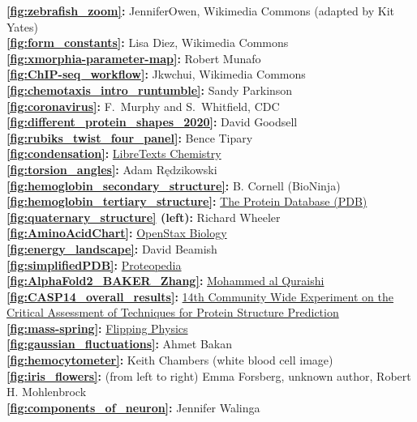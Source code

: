 \textbf{\autoref{fig:zebrafish_zoom}:} JenniferOwen, Wikimedia Commons (adapted by Kit Yates)\\
\textbf{\autoref{fig:form_constants}:} Lisa Diez, Wikimedia Commons\\
\textbf{\autoref{fig:xmorphia-parameter-map}:} Robert Munafo\\
\textbf{\autoref{fig:ChIP-seq_workflow}:} Jkwchui, Wikimedia Commons\\
\textbf{\autoref{fig:chemotaxis_intro_runtumble}:} Sandy Parkinson\\
\textbf{\autoref{fig:coronavirus}:} F.~Murphy and S.~Whitfield, CDC\\
\textbf{\autoref{fig:different_protein_shapes_2020}:} David Goodsell\\
\textbf{\autoref{fig:rubiks_twist_four_panel}:} Bence Tipary\\
\textbf{\autoref{fig:condensation}:} \href{https://bit.ly/3q0Ph8V}{LibreTexts Chemistry}\\
\textbf{\autoref{fig:torsion_angles}:} Adam Rędzikowski\\
\textbf{\autoref{fig:hemoglobin_secondary_structure}:} B. Cornell (BioNinja)\\
\textbf{\autoref{fig:hemoglobin_tertiary_structure}:} \href{https://www.rcsb.org/structure/1SI4}{The Protein Database (PDB)}\\
\textbf{\autoref{fig:quaternary_structure} (left):} Richard Wheeler\\
\textbf{\autoref{fig:AminoAcidChart}:} \href{https://openstax.org/books/biology/pages/1-introduction}{OpenStax Biology}\\
\textbf{\autoref{fig:energy_landscape}:} David Beamish\\
\textbf{\autoref{fig:simplifiedPDB}:} \href{https://proteopedia.org/wiki/index.php/Atomic_coordinate_file}{Proteopedia}\\
\textbf{\autoref{fig:AlphaFold2_BAKER_Zhang}:} \href{https://bit.ly/39Mnym3}{Mohammed al Quraishi}\\
\textbf{\autoref{fig:CASP14_overall_results}:} \href{https://predictioncenter.org/casp14/zscores_final.cgi}{14th Community Wide Experiment on the Critical Assessment of Techniques for Protein Structure Prediction}\\
\textbf{\autoref{fig:mass-spring}:} \href{flippingphysics.com}{Flipping Physics}\\
\textbf{\autoref{fig:gaussian_fluctuations}:} Ahmet Bakan\\
\textbf{\autoref{fig:hemocytometer}:} Keith Chambers (white blood cell image)\\
\textbf{\autoref{fig:iris_flowers}:} (from left to right) Emma Forsberg, unknown author, Robert H. Mohlenbrock\\
\textbf{\autoref{fig:components_of_neuron}:} Jennifer Walinga\\

\clearpage
\thispagestyle{empty}
\phantom{}

\clearpage
\thispagestyle{empty}
\phantom{}
